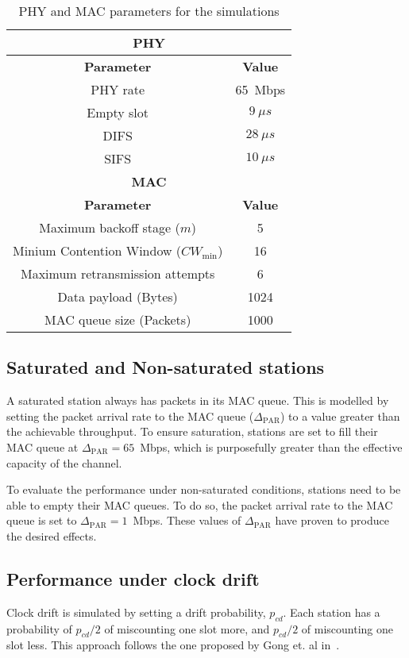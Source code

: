 	\begin{table}
		\centering
		\caption{PHY and MAC parameters for the simulations}
		\label{tab:mac-params}
		\begin{tabular}{|c|c|}
			\hline
			\multicolumn{2}{|c|}{{\bfseries PHY}}\\
			\hline
			{\bfseries Parameter} & {\bfseries Value}\\
			\hline
			PHY rate & 65~Mbps\\
			Empty slot & $9~\mu s$\\
			DIFS & $28~\mu s$\\
			SIFS & $10~\mu s$\\
			\hline
			\multicolumn{2}{|c|}{{\bfseries MAC}}\\
			\hline
			{\bfseries Parameter} & {\bfseries Value}\\
			\hline
			Maximum backoff stage ($m$) & 5\\
			Minium Contention Window ($CW_{\min}$) & 16\\
			Maximum retransmission attempts & 6\\
			Data payload (Bytes) & 1024\\
			MAC queue size (Packets) & 1000\\
			\hline
		\end{tabular}
	\end{table}
	
	\subsection{Saturated and Non-saturated stations}\label{unsaturation}
	A saturated station always has packets in its MAC queue. This is modelled by setting the packet arrival rate to the MAC queue ($\Delta_{\text{PAR}}$) to a value greater than the achievable throughput. To ensure saturation, stations are set to fill their MAC queue at $\Delta_{\text{PAR}}=65$~Mbps, which is purposefully greater than the effective capacity of the channel.
	
	To evaluate the performance under non-saturated conditions, stations need to be able to empty their MAC queues. To do so, the packet arrival rate to the MAC queue is set to $\Delta_{\text{PAR}}=1$~Mbps. These values of $\Delta_{\text{PAR}}$ have proven to produce the desired effects.
	
	\subsection{Performance under clock drift}
	Clock drift is simulated by setting a drift probability, $p_{cd}$. Each station has a probability of $p_{cd}/2$ of miscounting one slot more, and $p_{cd}/2$ of miscounting one slot less. This approach follows the one proposed by Gong et. al in~\cite{slotDrift}.
	
